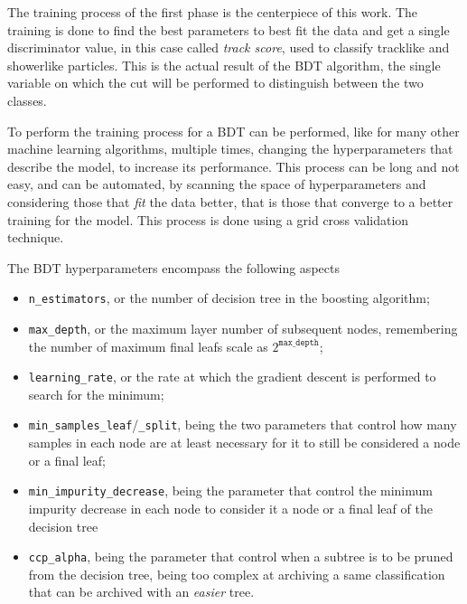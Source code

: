 The training process of the first phase is the centerpiece of this work. The training is done to find the best parameters to best fit the data and get a single discriminator value, in this case called \emph{track score}, used to classify tracklike and showerlike particles. This is the actual result of the BDT algorithm, the single variable on which the cut will be performed to distinguish between the two classes. 

To perform the training process for a BDT can be performed, like for many other machine learning algorithms, multiple times, changing the hyperparameters that describe the model, to increase its performance. This process can be long and not easy, and can be automated, by scanning the space of hyperparameters and considering those that \emph{fit} the data better, that is those that converge to a better training for the model. This process is done using a grid cross validation technique. 

The BDT hyperparameters encompass the following aspects\begin{itemize}
    \item \verb=n_estimators=, or the number of decision tree in the boosting algorithm;
    \item \verb=max_depth=, or the maximum layer number of subsequent nodes, remembering the number of maximum final leafs scale as $2^\texttt{max\_depth}$;
    \item \verb=learning_rate=, or the rate at which the gradient descent is performed to search for the minimum;
    \item \verb=min_samples_leaf=/\verb=_split=, being the two parameters that control how many samples in each node are at least necessary for it to still be considered a node or a final leaf;
    \item \verb=min_impurity_decrease=, being the parameter that control the minimum impurity decrease in each node to consider it a node or a final leaf of the decision tree
    \item \verb=ccp_alpha=, being the parameter that control when a subtree is to be pruned from the decision tree, being too complex at archiving a same classification that can be archived with an \emph{easier} tree.
\end{itemize}

